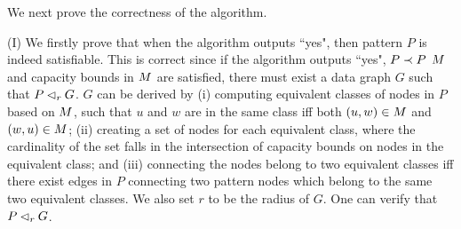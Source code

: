 \vspace{-1.5ex}
We next prove the correctness of the algorithm.

\vspace{-1.5ex}
(I) We firstly prove that when the algorithm outputs ``yes", then pattern $P$ is indeed satisfiable.
This is correct since if the algorithm outputs ``yes", \ie $P \prec P$ \wrt $M$ and capacity bounds in $M$ are satisfied, there must exist a data graph $G$ such that $P \lhd_r G$.
$G$ can be derived by (i) computing equivalent classes of nodes in $P$ based on $M$, such that $u$ and $w$ are in the same class iff both $(u, w)\in M$ and $(w, u)\in M$;
(ii) creating a set of nodes for each equivalent class, where the cardinality of the set falls in the intersection of capacity bounds on nodes in the equivalent class; and
(iii) connecting the nodes belong to two equivalent classes iff there exist edges in $P$ connecting two pattern nodes which belong to the same two equivalent classes.
We also set $r$ to be the radius of $G$. One can verify that $P \lhd_r G$.

